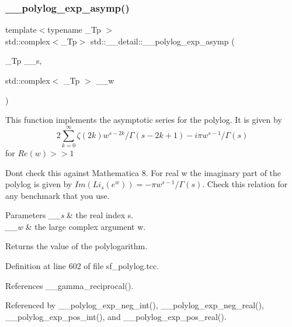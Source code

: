 \mbox{\label{namespacestd_1_1____detail_af3684fc449da490e9a43985245618a90}} 
\subsubsection{\texorpdfstring{\+\_\+\+\_\+polylog\+\_\+exp\+\_\+asymp()}{\_\_polylog\_exp\_asymp()}}
{\footnotesize\ttfamily template$<$typename \+\_\+\+Tp $>$ \\
std\+::complex$<$\+\_\+\+Tp$>$ std\+::\+\_\+\+\_\+detail\+::\+\_\+\+\_\+polylog\+\_\+exp\+\_\+asymp (\begin{DoxyParamCaption}\item[{\+\_\+\+Tp}]{\+\_\+\+\_\+s,  }\item[{std\+::complex$<$ \+\_\+\+Tp $>$}]{\+\_\+\+\_\+w }\end{DoxyParamCaption})}

This function implements the asymptotic series for the polylog. It is given by \[ 2 \sum_{k=0}^{\infty} \zeta(2k) w^{s-2k}/\Gamma(s-2k+1) -i \pi w^{s-1}/\Gamma(s) \] for $ Re(w) >> 1 $

Don\textquotesingle{}t check this against Mathematica 8. For real w the imaginary part of the polylog is given by $ Im(Li_s(e^w)) = -\pi w^{s-1}/\Gamma(s) $. Check this relation for any benchmark that you use.


\begin{DoxyParams}{Parameters}
{\em \+\_\+\+\_\+s} & the real index s. \\
\hline
{\em \+\_\+\+\_\+w} & the large complex argument w. \\
\hline
\end{DoxyParams}
\begin{DoxyReturn}{Returns}
the value of the polylogarithm. 
\end{DoxyReturn}


Definition at line 602 of file sf\+\_\+polylog.\+tcc.



References \+\_\+\+\_\+gamma\+\_\+reciprocal().



Referenced by \+\_\+\+\_\+polylog\+\_\+exp\+\_\+neg\+\_\+int(), \+\_\+\+\_\+polylog\+\_\+exp\+\_\+neg\+\_\+real(), \+\_\+\+\_\+polylog\+\_\+exp\+\_\+pos\+\_\+int(), and \+\_\+\+\_\+polylog\+\_\+exp\+\_\+pos\+\_\+real().

